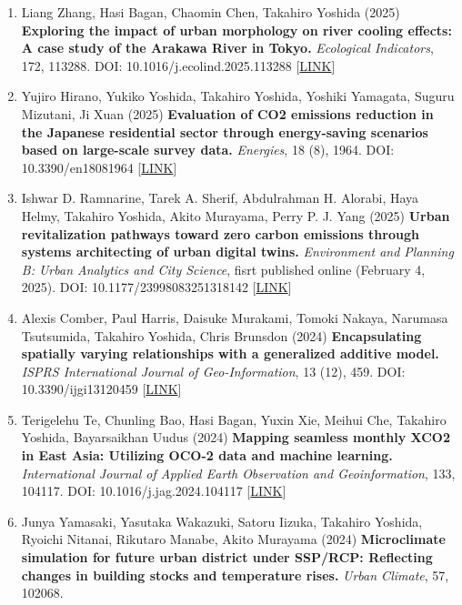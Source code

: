 \documentclass[
]{book}
\providecommand{\tightlist}{%
  \setlength{\itemsep}{0pt}\setlength{\parskip}{0pt}}
\begin{document}
\begin{enumerate}
\def\labelenumi{\arabic{enumi}.}
\tightlist
\item
  Liang Zhang, Hasi Bagan, Chaomin Chen, Takahiro Yoshida (2025)
  \textbf{Exploring the impact of urban morphology on river cooling effects: A case study of the Arakawa River in Tokyo.}
  \emph{Ecological Indicators}, 172, 113288.
  DOI: 10.1016/j.ecolind.2025.113288 {[}\href{https://doi.org/10.1016/j.ecolind.2025.113288}{LINK}{]}
\item
  Yujiro Hirano, Yukiko Yoshida, Takahiro Yoshida, Yoshiki Yamagata, Suguru Mizutani, Ji Xuan (2025)
  \textbf{Evaluation of CO2 emissions reduction in the Japanese residential sector through energy-saving scenarios based on large-scale survey data.}
  \emph{Energies}, 18 (8), 1964.
  DOI: 10.3390/en18081964 {[}\href{https://doi.org/10.3390/en18081964}{LINK}{]}
\item
  Ishwar D. Ramnarine, Tarek A. Sherif, Abdulrahman H. Alorabi, Haya Helmy, Takahiro Yoshida, Akito Murayama, Perry P. J. Yang (2025)
  \textbf{Urban revitalization pathways toward zero carbon emissions through systems architecting of urban digital twins.}
  \emph{Environment and Planning B: Urban Analytics and City Science}, fisrt published online (February 4, 2025).
  DOI: 10.1177/23998083251318142 {[}\href{https://doi.org/10.1177/23998083251318142}{LINK}{]}
\item
  Alexis Comber, Paul Harris, Daisuke Murakami, Tomoki Nakaya, Narumasa Tsutsumida, Takahiro Yoshida, Chris Brunsdon (2024)
  \textbf{Encapsulating spatially varying relationships with a generalized additive model.}
  \emph{ISPRS International Journal of Geo-Information}, 13 (12), 459.
  DOI: 10.3390/ijgi13120459 {[}\href{https://doi.org/10.3390/ijgi13120459}{LINK}{]}
\item
  Terigelehu Te, Chunling Bao, Hasi Bagan, Yuxin Xie, Meihui Che, Takahiro Yoshida, Bayarsaikhan Uudus (2024)
  \textbf{Mapping seamless monthly XCO2 in East Asia: Utilizing OCO-2 data and machine learning.}
  \emph{International Journal of Applied Earth Observation and Geoinformation}, 133, 104117.
  DOI: 10.1016/j.jag.2024.104117 {[}\href{https://www.sciencedirect.com/science/article/pii/S1569843224004710}{LINK}{]}
\item
  Junya Yamasaki, Yasutaka Wakazuki, Satoru Iizuka, Takahiro Yoshida, Ryoichi Nitanai, Rikutaro Manabe, Akito Murayama (2024)
  \textbf{Microclimate simulation for future urban district under SSP/RCP: Reflecting changes in building stocks and temperature rises.}
  \emph{Urban Climate}, 57, 102068.

\end{enumerate}
\end{document}
